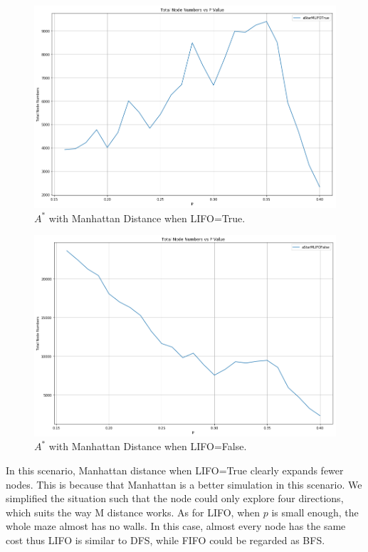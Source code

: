 \documentclass[letter]{article}
\begin{document}
\begin{questions}
	\begin{figure}
		\centering
		\includegraphics[width=\textwidth]{../pics/question6-2.png}
		\caption{\label{fig:6-2} $ A^* $ with Manhattan Distance when LIFO=True.}
	\end{figure}

	\begin{figure}
		\centering
		\includegraphics[width=\textwidth]{../pics/question6-3.png}
		\caption{\label{fig:6-3}$ A^* $ with Manhattan Distance when LIFO=False.}
	\end{figure}

	In this scenario, Manhattan distance when LIFO=True clearly expands fewer nodes. This is because that Manhattan is a better simulation in this scenario. We simplified the situation such that the node could only explore four directions, which suits the way M distance works. As for LIFO, when $ p $ is small enough, the whole maze almost has no walls. In this case, almost every node has the same cost thus LIFO is similar to DFS, while FIFO could be regarded as BFS. \\
	

\end{questions}
\end{document}
